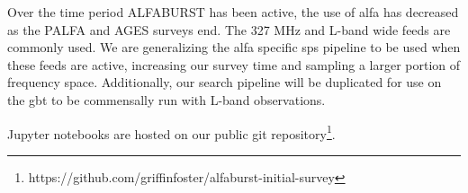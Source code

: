 \documentclass[a4paper,fleqn,usenatbib]{mnras}
\begin{document}
Over the time period ALFABURST has been active, the use of \gls{alfa} has
decreased as the PALFA and AGES surveys end. The 327 MHz and L-band wide feeds
are commonly used. We are generalizing the \gls{alfa} specific \gls{sps}
pipeline to be used when these feeds are active, increasing our survey time and
sampling a larger portion of frequency space. Additionally, our search pipeline
will be duplicated for use on the \gls{gbt} to be commensally run with L-band
observations. 

Jupyter notebooks are hosted on our public git
repository\footnote{https://github.com/griffinfoster/alfaburst-initial-survey}.


 

\bsp	%
\label{lastpage}
\end{document}
